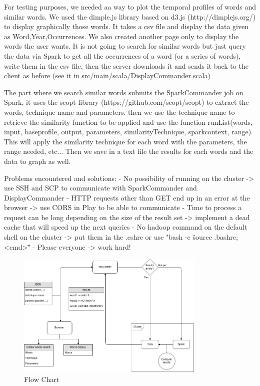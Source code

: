 \documentclass{article}
\begin{document}
For testing purposes, we needed aa way to plot the temporal profiles of words and similar words.
We used the dimple.js library based on d3.js (http://dimplejs.org/) to display graphically those words.
It takes a csv file and display the data given as Word,Year,Occurrences.
We also created another page only to display the words the user wants.
It is not going to search for similar words but just query the data via Spark to get all the occurrences of a word (or a series of words), write them in the csv file, then the server downloads it and sends it back to the client as before (see it in src/main/scala/DisplayCommander.scala)

The part where we search similar words submits the SparkCommander job on Spark, it uses the scopt library (https://github.com/scopt/scopt) to extract the words, technique name and parameters.
then we use the technique name to retrieve the similarity function to be applied and use the function runList(words, input, baseprofile, output, parameters, similarityTechnique, sparkcontext, range).
This will apply the similarity technique for each word with the parameters, the range needed, etc...
Then we save in a text file the results for each words and the data to graph as well.

Problems encountered and solutions:
	- No possibility of running on the cluster -> use SSH and SCP to communicate with SparkCommander and DisplayCommander
	- HTTP requests other than GET end up in an error at the browser -> use CORS in Play to be able to communicate
	- Time to process a request can be long depending on the size of the result set -> implement a dead cache that will speed up the next queries
	- No hadoop command on the default shell on the cluster -> put them in the .cshrc or use "bash -c \"source .bashrc; <cmd>\"" 
	- Please everyone -> work hard!

\begin{figure}[ht!]
\centering
\includegraphics[width=90mm]{Flowchart.jpg}
\caption{Flow Chart \label{overflow}}
\end{figure}
\end{document}
